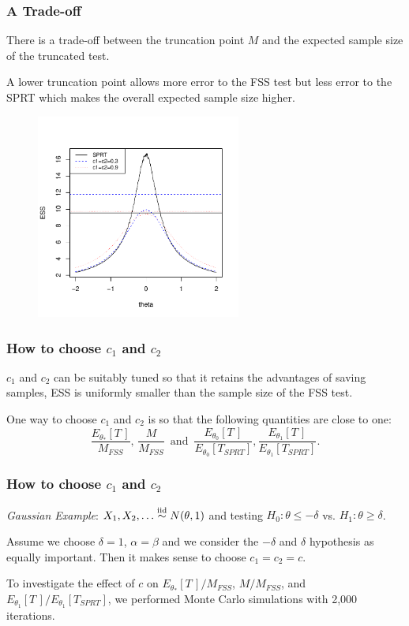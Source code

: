 \documentclass[10pt]{beamer}
\begin{document}
\begin{frame}
\frametitle{A Trade-off}

There is a trade-off between the truncation point $M$ and the expected sample size of the truncated test.

A lower truncation point allows more error to the FSS test but less error to the SPRT which makes the overall expected sample size higher.

\begin{figure}
\centering
\includegraphics[height=0.6\textheight, width=0.6\textwidth]{trade-off.pdf}
\end{figure}

\end{frame}

\begin{frame}
\frametitle{How to choose $c_1$ and $c_2$}

$c_1$ and $c_2$ can be suitably tuned so that it retains the advantages of saving samples, ESS is uniformly smaller than the sample size of the FSS test.

One way to choose $c_1$ and $c_2$ is so that the following quantities are close to one:
\[
\frac{E_{\theta_{*}}[T\,]}{M_{FSS}}, \, \frac{M}{M_{FSS}}  \, \text{ and } \, \frac{E_{\theta_0}[T\,]}{E_{\theta_0}[T_{SPRT}]}, \frac{E_{\theta_1}[T\,]}{E_{\theta_1}[T_{SPRT}]}.
\]

\end{frame}

\begin{frame}
\frametitle{How to choose $c_1$ and $c_2$}
\textit{Gaussian Example}: $X_1, X_2, \dots  \overset{\text{iid}}\sim N(\theta, 1)$ and testing $H_0: \theta \leq -\delta$ vs. $H_1: \theta \geq \delta$.

Assume we choose $\delta =1$, $\alpha = \beta$ and we consider the $-\delta$ and $\delta$ hypothesis as equally important. Then it makes sense to choose $c_1 = c_2 = c$.

To investigate the effect of $c$ on $E_{\theta_{*}}[T\,] / M_{FSS}$, $M / M_{FSS}$, and $E_{\theta_1}[T\,] / E_{\theta_1}[T_{SPRT}]$, we performed Monte Carlo simulations with 2,000 iterations.

\end{frame}
\end{document}
